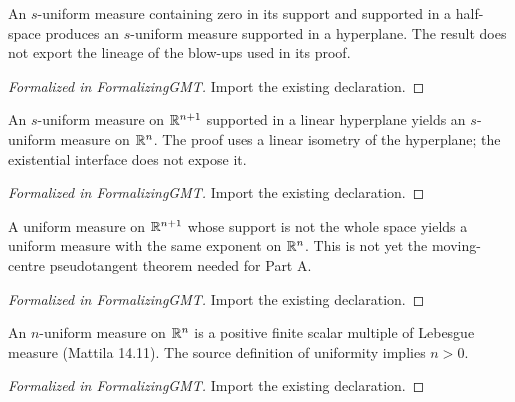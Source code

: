 \begin{lemma}
\label{gmt:uniform-hyperplane}
\leanok
{}
An $s$-uniform measure containing zero in its support and supported in a half-space produces an $s$-uniform measure supported in a hyperplane. The result does not export the lineage of the blow-ups used in its proof.
\end{lemma}
\begin{proof}[Formalized in FormalizingGMT]
\leanok
{}
Import the existing declaration.
\end{proof}

\begin{lemma}
\label{gmt:hyperplane-transport}
\leanok
{}
An $s$-uniform measure on $\mathbb R^{n+1}$ supported in a linear hyperplane yields an $s$-uniform measure on $\mathbb R^n$. The proof uses a linear isometry of the hyperplane; the existential interface does not expose it.
\end{lemma}
\begin{proof}[Formalized in FormalizingGMT]
\leanok
Import the existing declaration.
\end{proof}

\begin{lemma}
\label{gmt:uniform-lower-dim}
\leanok
{}
A uniform measure on $\mathbb R^{n+1}$ whose support is not the whole space yields a uniform measure with the same exponent on $\mathbb R^n$. This is not yet the moving-centre pseudotangent theorem needed for Part A.
\end{lemma}
\begin{proof}[Formalized in FormalizingGMT]
\leanok
{}
Import the existing declaration.
\end{proof}

\begin{theorem}
\label{gmt:uniform-full-dimension}
\leanok
{}
An $n$-uniform measure on $\mathbb R^n$ is a positive finite scalar multiple of Lebesgue measure (Mattila 14.11). The source definition of uniformity implies $n>0$.
\end{theorem}
\begin{proof}[Formalized in FormalizingGMT]
\leanok
{}
Import the existing declaration.
\end{proof}

